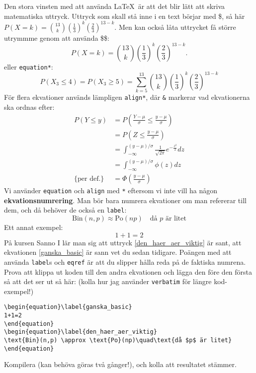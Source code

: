 \documentclass[11pt,a4paper]{article}
\begin{document}
Den stora vinsten med att använda \LaTeX\ är att det blir lätt att skriva matematiska uttryck. Uttryck som skall stå inne i en text börjar med \$, så här $P(X=k)=\binom{13}{k} (\frac{1}{3})^k (\frac{2}{3})^{13-k}$. Men kan också låta uttrycket få större utrymmme genom att använda \$\$:
$$
P(X=k)=\binom{13}{k} \left( \frac{1}{3} \right)^k \left( \frac{2}{3}\right)^{13-k}. %
$$
eller \texttt{equation*}:
\begin{equation*}
P(X_3 \leq 4) = P(X_3 \geq 5) = \sum_{k=5}^{13}\binom{13}{k} \left( \frac{1}{3} \right)^k \left( \frac{2}{3}\right)^{13-k}
\end{equation*}
För flera ekvationer används lämpligen \texttt{align*}, där \texttt{\&} markerar vad ekvationerna ska ordnas efter:
\begin{align*}
P(Y \leq y) &= P\left(\frac{Y-\mu}{\sigma} \leq \frac{y-\mu}{\sigma} \right) \\
&= P\left(Z \leq \frac{y-\mu}{\sigma} \right) \\
&= \int_{-\infty}^{ (y-\mu)/\sigma } \frac{1}{ \sqrt{2\pi} } e^{ -\frac{z^2}{2} } dz \\
&= \int_{-\infty}^{ (y-\mu)/\sigma }\phi(z)dz \\
\{ \text{per def.} \}&= \Phi\left(\frac{y-\mu}{\sigma}\right)
\end{align*}
Vi använder \texttt{equation} och \texttt{align} med \texttt{*} eftersom vi inte vill ha någon \textbf{ekvationsnumrering}. Man bör bara numrera ekvationer om man refererar till dem, och då behöver de också en \texttt{label}:
\begin{equation}\label{den_haer_aer_viktig}
\text{Bin}(n,p) \approx \text{Po}(np)\quad\text{då $p$ är litet}
\end{equation}
Ett annat exempel:
\begin{equation}\label{ganska_basic}
1+1=2
\end{equation}
På kursen Sanno I lär man sig att uttryck \eqref{den_haer_aer_viktig} är sant, att ekvationen \eqref{ganska_basic} är sann vet du sedan tidigare. Poängen med att använda \texttt{label}s och \texttt{eqref} är att du slipper hålla reda på de faktiska numrena. Prova att klippa ut koden till den andra ekvationen och lägga den före den första så att det ser ut så här: (kolla hur jag använder \texttt{verbatim} för längre kod-exempel!)

\begin{verbatim}
\begin{equation}\label{ganska_basic}
1+1=2
\end{equation}
\begin{equation}\label{den_haer_aer_viktig}
\text{Bin}(n,p) \approx \text{Po}(np)\quad\text{då $p$ är litet}
\end{equation}
\end{verbatim}
Kompilera (kan behöva göras två gånger!), och kolla att resultatet stämmer.
\end{document}
